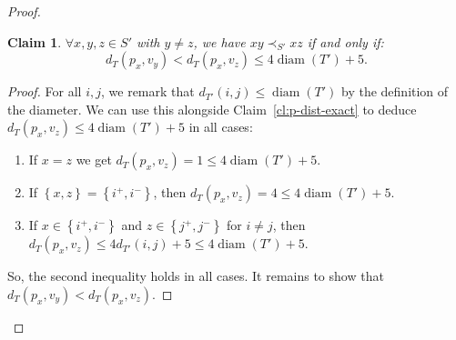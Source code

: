 \documentclass[11pt, letter]{article}
\newtheorem{claim}[theorem]{Claim}
\theoremstyle{remark}
\DeclareMathOperator{\diam}{diam}
\newcommand{\set}[1]{\left\{#1\right\}}
\begin{document}
\begin{proof}
\begin{claim}\label{cl:p-dist}
    $\forall x,y,z\in S'$ with $y \neq z$, we have $xy\prec_{S'} xz$ if and only if:
    $$d_{T}(p_x,v_y)< d_{T}(p_x,v_z)\leq 4\diam(T')+5.$$
\end{claim}
\begin{proof}
    For all $i,j$, we remark that $d_{T'}(i,j)\leq \diam(T')$ by the definition of the diameter. We can use this alongside Claim~\ref{cl:p-dist-exact} to deduce $d_{T}(p_x,v_z)\leq 4\diam(T')+5$ in all cases:
    \begin{enumerate}
        \item If $x=z$ we get $d_{T}(p_x,v_z)=1\leq 4\diam(T')+5$. 
        \item If $\set{x,z}=\set{i^+,i^-}$, then $d_T(p_x,v_z)=4\leq 4\diam(T')+5$.
        \item If $x\in\set{i^+,i^-}$ and $z\in \set{j^+,j^-}$ for $i\neq j$, then $d_T(p_x,v_z)\leq 4d_{T'}(i,j)+5\leq 4\diam(T')+5$.
    \end{enumerate}
    
    So, the second inequality holds in all cases. It remains to show that $d_{T}(p_x,v_y)< d_{T}(p_x,v_z)$.


\end{proof}
\end{proof}
\end{document}
